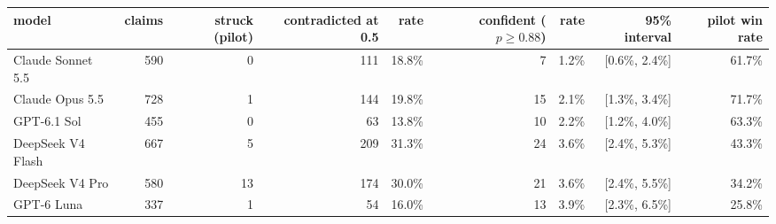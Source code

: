 \begin{tabular}{lrrrrrrrr}
\toprule
model & claims & struck (pilot) & contradicted at 0.5 & rate & confident ($p \geq 0.88$) & rate & 95\% interval & pilot win rate \\
\midrule
Claude Sonnet 5.5 & 590 & 0 & 111 & 18.8\% & 7 & 1.2\% & [0.6\%, 2.4\%] & 61.7\% \\
Claude Opus 5.5 & 728 & 1 & 144 & 19.8\% & 15 & 2.1\% & [1.3\%, 3.4\%] & 71.7\% \\
GPT-6.1 Sol & 455 & 0 & 63 & 13.8\% & 10 & 2.2\% & [1.2\%, 4.0\%] & 63.3\% \\
DeepSeek V4 Flash & 667 & 5 & 209 & 31.3\% & 24 & 3.6\% & [2.4\%, 5.3\%] & 43.3\% \\
DeepSeek V4 Pro & 580 & 13 & 174 & 30.0\% & 21 & 3.6\% & [2.4\%, 5.5\%] & 34.2\% \\
GPT-6 Luna & 337 & 1 & 54 & 16.0\% & 13 & 3.9\% & [2.3\%, 6.5\%] & 25.8\% \\
\bottomrule
\end{tabular}

